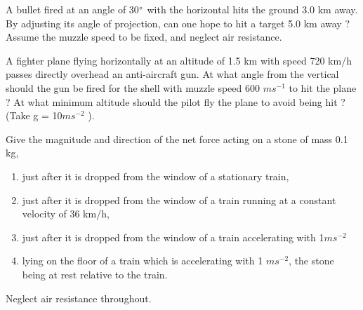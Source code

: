 \item A bullet fired at an angle of 30$\degree$ with the horizontal hits the ground 3.0 km away. By adjusting its angle of projection, can one hope to hit a target 5.0 km away ? Assume the muzzle speed to be fixed, and neglect air resistance.
\item  A fighter plane flying horizontally at an altitude of 1.5 km with speed 720 km/h passes directly overhead an anti-aircraft gun. At what angle from the vertical should the gun be fired for the shell with muzzle speed 600 $m s^{-1}$ to hit the plane ? 
At what minimum  altitude should the pilot fly the plane to avoid being hit ? (Take g = 10$ m s^{-2}$
).
\item Give the magnitude and direction of the net force acting on a stone of mass 0.1 kg, 
\begin{enumerate}
\item  just after it is dropped from the window of a stationary train, 
\item  just after it is dropped from the window of a train running at a constant velocity of 36 km/h,
\item  just after it is dropped from the window of a train accelerating with 1$ m s^{-2} $
\item  lying on the floor of a train which is accelerating with 1 $m s^{-2}$, the stone being at rest relative to the train.
\end{enumerate}
Neglect air resistance throughout. 

